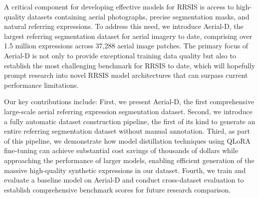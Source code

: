 A critical component for developing effective models for RRSIS is access to high-quality datasets containing aerial photographs, precise segmentation masks, and natural referring expressions. To address this need, we introduce Aerial-D, the largest referring segmentation dataset for aerial imagery to date, comprising over 1.5 million expressions across 37,288 aerial image patches. The primary focus of Aerial-D is not only to provide exceptional training data quality but also to establish the most challenging benchmark for RRSIS to date, which will hopefully prompt research into novel RRSIS model architectures that can surpass current performance limitations.

Our key contributions include: First, we present Aerial-D, the first comprehensive large-scale aerial referring expression segmentation dataset. Second, we introduce a fully automatic dataset construction pipeline, the first of its kind to generate an entire referring segmentation dataset without manual annotation. Third, as part of this pipeline, we demonstrate how model distillation techniques using QLoRA fine-tuning can achieve substantial cost savings of thousands of dollars while approaching the performance of larger models, enabling efficient generation of the massive high-quality synthetic expressions in our dataset. Fourth, we train and evaluate a baseline model on Aerial-D and conduct cross-dataset evaluation to establish comprehensive benchmark scores for future research comparison.

